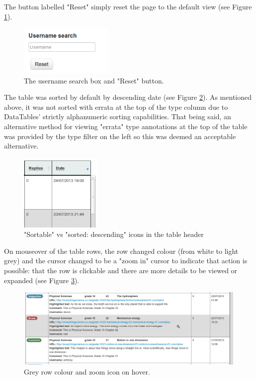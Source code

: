 The button labelled "Reset" simply reset the page to the default view (see Figure \ref{fig:reset}). 
\begin{figure}[h!]
    \centering
    \includegraphics[width=0.4\textwidth]{Figures/V1/usernameReset.png}
 \caption{The username search box and "Reset" button.}
 \label{fig:reset}

\end{figure}

The table was sorted by default by descending date (see Figure \ref{fig:sort}).  As mentioned above, it was not sorted with errata at the top of  the type column due to DataTables' strictly alphanumeric sorting capabilities. That being said, an alternative method for viewing "errata" type annotations at the top of the table was provided by the type filter on the left so this was deemed an acceptable alternative. 
\begin{figure}[h!]
    \centering
    \includegraphics[width=0.35\textwidth]{Figures/V1/sorticons.png}
 \caption{"Sortable" vs "sorted: descending" icons in the table header}
 \label{fig:sort}

\end{figure}	

On mouseover of the table rows, the row changed colour (from white to light grey) and the cursor changed to be a "zoom in" cursor to indicate that action is possible: that the row is clickable and there are more details to be viewed or expanded (see Figure \ref{fig:mouseover}).

\begin{figure}[h!]
    \centering
    \includegraphics[width=\textwidth]{Figures/V1/mouseover.png}
 \caption{Grey row colour and zoom icon on hover.}
 \label{fig:mouseover}

\end{figure}

